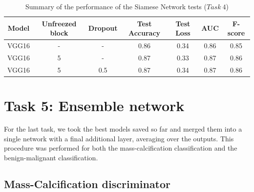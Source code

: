 \documentclass[11pt,a4paper,oneside]{article}
\begin{document}
\begin{table}[h]
\centering
	\begin{tabular}{|ccc|cccc|}
	\hline
	Model & Unfreezed block & Dropout & Test Accuracy & Test Loss & AUC & F-score \\
	\hline
	VGG16 & - & -   & 0.86 & 0.34 & 0.86 & 0.85 \\
	VGG16 & 5 & -   & 0.87 & 0.33 & 0.87 & 0.86 \\
	VGG16 & 5 & 0.5 & 0.87 & 0.34 & 0.87 & 0.86 \\
	\hline
	\end{tabular}
\caption{Summary of the performance of the Siamese Network tests ($Task\ 4$)}
\end{table}

\clearpage

\section{Task 5: Ensemble network}
For the last task, we took the best models saved so far and merged them into a single network with a final additional layer, averaging over the outputs. This procedure was performed for both the mass-calcification classification and the benign-malignant classification.

\subsection{Mass-Calcification discriminator}
\end{document}
